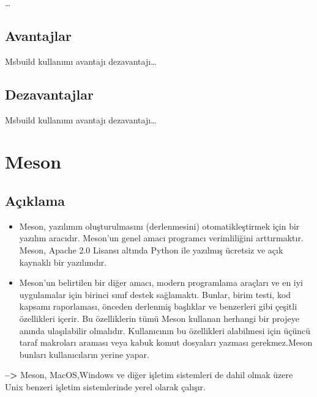 \documentclass[
]{book}
\begin{document}
\ldots{}

\hypertarget{avantajlar-3}{%
\section*{Avantajlar}\label{avantajlar-3}}

Msbuild kullanımı avantajı dezavantajı\ldots{}

\hypertarget{dezavantajlar-3}{%
\section*{Dezavantajlar}\label{dezavantajlar-3}}

Msbuild kullanımı avantajı dezavantajı\ldots{}

\hypertarget{meson}{%
\chapter*{Meson}\label{meson}}

\hypertarget{auxe7ux131klama-5}{%
\section*{Açıklama}\label{auxe7ux131klama-5}}

\begin{itemize}
\item
  Meson, yazılımın oluşturulmasını (derlenmesini) otomatikleştirmek için bir yazılım aracıdır. Meson'un genel amacı programcı verimliliğini arttırmaktır. Meson, Apache 2.0 Lisansı altında Python ile yazılmış ücretsiz ve açık kaynaklı bir yazılımdır.
\item
  Meson'un belirtilen bir diğer amacı, modern programlama araçları ve en iyi uygulamalar için birinci sınıf destek sağlamaktı. Bunlar, birim testi, kod kapsamı raporlaması, önceden derlenmiş başlıklar ve benzerleri gibi çeşitli özellikleri içerir. Bu özelliklerin tümü Meson kullanan herhangi bir projeye anında ulaşılabilir olmalıdır. Kullanıcının bu özellikleri alabilmesi için üçüncü taraf makroları araması veya kabuk komut dosyaları yazması gerekmez.Meson bunları kullanıcıların yerine yapar.
\end{itemize}

\textbf{--\textgreater{}} Meson, MacOS,Windows ve diğer işletim sistemleri de dahil olmak üzere Unix benzeri işletim sistemlerinde yerel olarak çalışır.
\end{document}
